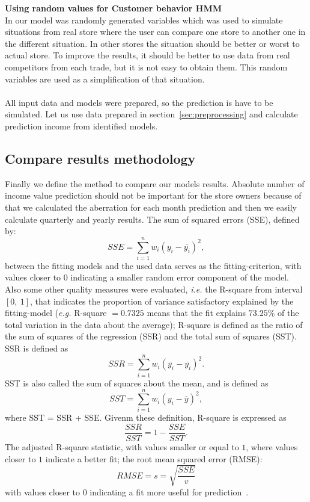 \textbf{Using random values for Customer behavior HMM}\\
In our model was randomly generated variables which was used to simulate situations from real store where the user can compare one store to another one in the different situation.
In other stores the situation should be better or worst to actual store.
To improve the results, it should be better to use data from real competitors from each trade, but it is not easy to obtain them.
This random variables are used as a simplification of that situation.\\
\\
All input data and models were prepared, so the prediction is have to be simulated.
Let us use data prepared in section~\ref{sec:preprocessing} and calculate prediction income from identified models.
\subsection{Compare results methodology} \label{subsec:matlab}
Finally we define the method to compare our models results.
Absolute number of income value prediction should not be important for the store owners because of that we calculated the aberration for each month
prediction and then we easily calculate quarterly and yearly results.
The sum of squared errors (SSE), defined by:
$$SSE = \sum^n_{i=1}w_i(y_i - \overline{y_i})^2,$$
between the fitting models and the used data serves as the fitting-criterion,
with values closer to $0$ indicating a smaller random error component of the model.
Also some other quality measures were evaluated, \textit{i.e.} the R-square from interval $[0,\ 1]$,
that indicates the proportion of variance satisfactory explained by the fitting-model (\textit{e.g.}  R-square $= 0.7325$ means
that the fit explains $73.25\%$ of the total variation in the data about the average);
R-square is defined as the ratio of the sum of squares of the regression (SSR) and the total sum of squares (SST).
SSR is defined as
$$SSR = \sum_{i=1}^nw_i(\overline{y_i} - \overline{y_i})^2.$$
SST is also called the sum of squares about the mean, and is defined as
$$SST = \sum_{i=1}^nw_i(y_i - \overline{y})^2,$$
where SST = SSR + SSE. Givenm these definition, R-square is expressed as
$$\frac{SSR}{SST} = 1 - \frac{SSE}{SST}.$$
The adjusted R-square statistic, with values smaller or equal to $1$, where values closer to $1$ indicate a better fit; the root mean squared error (RMSE):\\
$$RMSE = s = \sqrt{\frac{SSE}{v}}$$
with values closer to $0$ indicating a fit more useful for prediction~\cite{cftool}.
